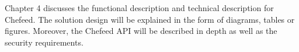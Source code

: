 Chapter 4 discusses the functional description and technical description for Chefeed. The solution design will be explained in the form of diagrams, tables or figures. Moreover, the Chefeed API will be described in depth as well as the security requirements.
